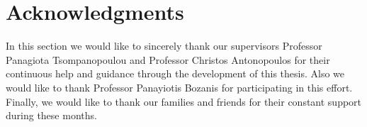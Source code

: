 % 

\cleardoublepage

\section*{Acknowledgments}

In this section we would like to sincerely thank our supervisors Professor Panagiota Tsompanopoulou
and Professor Christos Antonopoulos for their continuous help and guidance through the development
of this thesis. Also we would like to thank Professor Panayiotis Bozanis for participating in this effort.
Finally, we would like to thank our families and friends for their constant support during 
these months.

